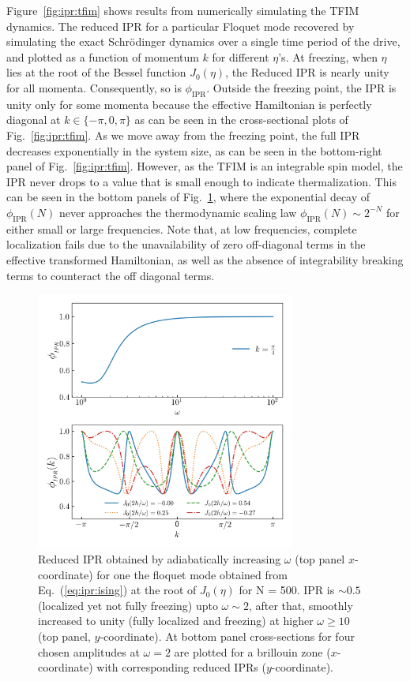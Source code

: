 \documentclass[%
reprint,
superscriptaddress,
amsmath,amssymb,
aps,
prb,
showkeys,
]{revtex4-2}
\begin{document}
Figure~\ref{fig:ipr:tfim} shows results from numerically simulating the TFIM dynamics. The reduced IPR for a particular Floquet mode recovered by simulating the exact Schr\"odinger dynamics over a single time period of the drive, and plotted as a function of momentum $k$ for different $\eta$'s. At freezing, when $\eta$ lies at the root of the Bessel function $J_0(\eta)$,  the {Reduced} IPR is {nearly} unity for all momenta. Consequently, so is $\phi_\mathrm{IPR}$.  Outside the freezing point, the IPR is unity only for some momenta because the effective Hamiltonian is perfectly diagonal at $k \in{\{-\pi, 0, \pi\}}$ as can be seen in the cross-sectional plots of Fig.~\ref{fig:ipr:tfim}. As we move away from the freezing point, the full IPR decreases exponentially in the system size, as can be seen in the bottom-right panel of Fig.~\ref{fig:ipr:tfim}.
However, as the TFIM is an integrable spin model, the IPR never drops to a value that is small enough to indicate thermalization. This can be seen in the bottom panels of Fig.~\ref{fig:ipr:isinglowfrk}, where the exponential decay of $\phi_\mathrm{IPR}(N)$ never approaches the thermodynamic scaling law $\phi_\mathrm{IPR}(N)\sim 2^{-N}$ for either small or large frequencies. Note that, at low frequencies, {complete localization} fails due to the unavailability of zero off-diagonal terms in the  effective transformed Hamiltonian, as well as the absence of integrability breaking terms to counteract the off diagonal terms. 
\begin{figure}[t!]
	\centering
	\includegraphics[width = 8.5cm]{figure_3.jpeg}
	\caption{Reduced IPR obtained by adiabatically increasing $\omega$ (top panel $x$-coordinate) for one the floquet mode obtained from Eq.~(\ref{eq:ipr:ising}) at the root of $J_0(\eta)$ for N = 500. IPR is $\sim 0.5$ (localized yet not fully freezing) upto $\omega \sim 2$, after that, smoothly increased to unity (fully localized and freezing) at higher $\omega \geq 10$ (top panel, $y$-coordinate). At bottom panel cross-sections for four chosen amplitudes at $\omega =2$ are plotted for a brillouin zone ($x$-coordinate) with corresponding reduced IPRs ($y$-coordinate).}
	\label{fig:ipr:isinglowfrk}
\end{figure}
\end{document}
